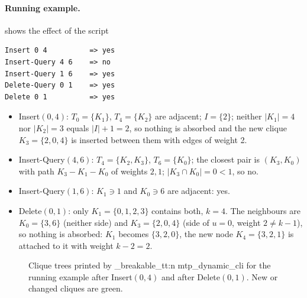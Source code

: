 \documentclass[11pt,a4paper,oneside]{report}
\theoremstyle{plain}
\theoremstyle{definition}
\theoremstyle{remark}
\newcommand{\yes}{\textsf{yes}}
\newcommand{\no}{\textsf{no}}
\newcommand{\op}[1]{\textsf{#1}}
\DeclareRobustCommand{\code}[1]{\mtp_breakable_tt:n {#1}}
\begin{document}
\paragraph{Running example.}  shows the effect of the script
\begin{lstlisting}[style=shell]
Insert 0 4          => yes
Insert-Query 4 6    => no
Insert-Query 1 6    => yes
Delete-Query 0 1    => yes
Delete 0 1          => yes
\end{lstlisting}
\begin{itemize}
\item \op{Insert}\((0,4)\): \(T_0=\{K_1\}\), \(T_4=\{K_2\}\) are adjacent; \(I=\{2\}\);
  neither \(|K_1|=4\) nor \(|K_2|=3\) equals \(|I|+1=2\), so nothing is absorbed and the new
  clique \(K_3=\{2,0,4\}\) is inserted between them with edges of weight 2.
\item \op{Insert-Query}\((4,6)\): \(T_4=\{K_2,K_3\}\), \(T_6=\{K_0\}\); the closest pair is
  \((K_3,K_0)\) with path \(K_3\!-\!K_1\!-\!K_0\) of weights \(2,1\); \(|K_3\cap K_0|=0<1\),
  so \no.
\item \op{Insert-Query}\((1,6)\): \(K_1\ni 1\) and \(K_0\ni 6\) are adjacent: \yes.
\item \op{Delete}\((0,1)\): only \(K_1=\{0,1,2,3\}\) contains both, \(k=4\). The neighbours
  are \(K_0=\{3,6\}\) (neither side) and \(K_3=\{2,0,4\}\) (side of \(u=0\), weight \(2\ne
  k-1\)), so nothing is absorbed: \(K_1\) becomes \(\{3,2,0\}\), the new node
  \(K_4=\{3,2,1\}\) is attached to it with weight \(k-2=2\).
\end{itemize}

\begin{figure}[ht]
\centering
{}
\caption[A1 trace on the running example]{Clique trees printed by \code{mtp_dynamic_cli} for
the running example after \op{Insert}\((0,4)\) and after \op{Delete}\((0,1)\). New or changed
cliques are green.}
\label{fig:trace-ex}
\end{figure}
\end{document}
